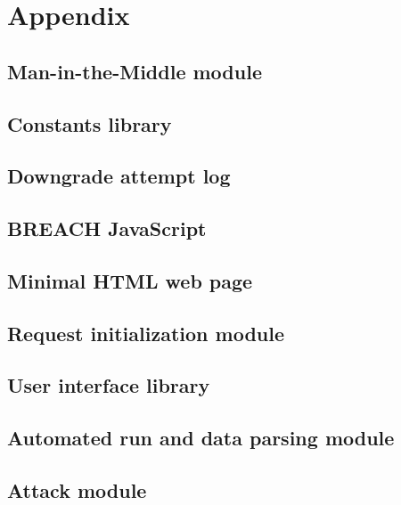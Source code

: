\chapter{Appendix}\label{ch:appendix}

\section{Man-in-the-Middle module}\label{sec:connect_py}


\section{Constants library}\label{sec:constants_py}


\section{Downgrade attempt log}\label{sec:downgrade_log}


\section{BREACH JavaScript}\label{sec:evil_js}


\section{Minimal HTML web page}\label{sec:index_html}


\section{Request initialization module}\label{sec:hillclimbing_py}


\section{User interface library}\label{sec:io_library_py}


\section{Automated run and data parsing module}\label{sec:parse_py}


\section{Attack module}\label{sec:io_library_py}


